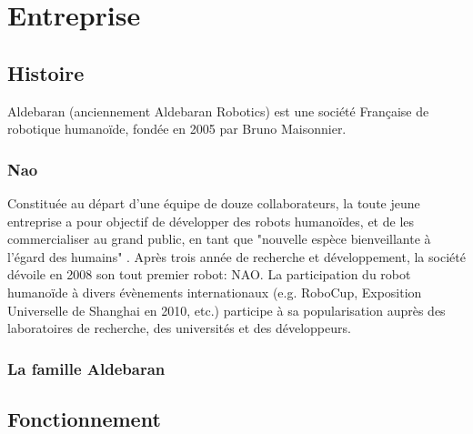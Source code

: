 \chapter*{Entreprise}
\label{Entreprise}
\thispagestyle{fancy}

\section{Histoire}
\label{Entreprise: histoire}
Aldebaran (anciennement Aldebaran Robotics) est une société Française de robotique humanoïde, fondée en 2005 par Bruno Maisonnier. 

\subsection{Nao}
\label{Entreprise:Histoire:Nao}
Constituée au départ d'une équipe de douze collaborateurs, la toute jeune entreprise a pour objectif de développer des robots humanoïdes, et de les commercialiser au grand public, en tant que "nouvelle espèce bienveillante à l'égard des humains" . Après trois année de recherche et développement, la société dévoile en 2008 son tout premier robot: NAO. La participation du robot humanoïde à divers évènements internationaux (e.g. RoboCup, Exposition Universelle de Shanghai en 2010, etc.) participe à sa popularisation auprès des laboratoires de recherche, des universités et des développeurs. 

\subsection{La famille Aldebaran}

\section{Fonctionnement}
